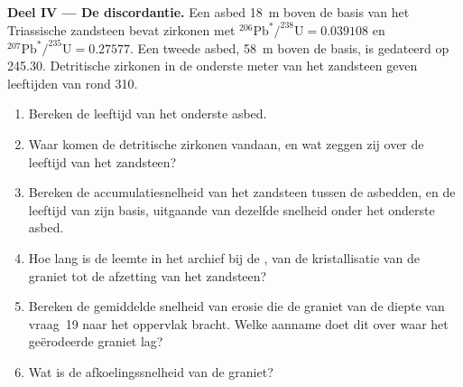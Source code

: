 \begin{problem}
\noindent\textbf{Deel IV --- De discordantie.} Een asbed \qty{18}{m} boven de basis van het Triassische zandsteen bevat zirkonen met $^{206}\mathrm{Pb}^*/^{238}\mathrm{U} = 0.039108$ en
$^{207}\mathrm{Pb}^*/^{235}\mathrm{U} = 0.27577$. Een tweede asbed, \qty{58}{m} boven de basis, is gedateerd op \qty{245.30}{\Ma}. Detritische zirkonen in de onderste meter van het zandsteen geven leeftijden van rond \qty{310}{\Ma}.
\begin{enumerate}[resume]
  \item Bereken de leeftijd van het onderste asbed.
  \item Waar komen de detritische zirkonen vandaan, en wat zeggen zij over de leeftijd van het zandsteen?
  \item Bereken de accumulatiesnelheid van het zandsteen tussen de asbedden, en de leeftijd van zijn basis, uitgaande van dezelfde snelheid onder het onderste asbed.
  \item Hoe lang is de leemte in het archief bij de , van de kristallisatie van de graniet tot de afzetting van het zandsteen?
  \item Bereken de gemiddelde snelheid van erosie die de graniet van de diepte van vraag~19 naar het oppervlak bracht. Welke aanname doet dit over waar het geërodeerde graniet lag?
  \item Wat is de afkoelingssnelheid van de graniet?
\end{enumerate}
\end{problem}
